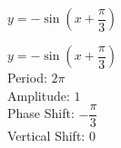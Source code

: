 {$y = -\sin \left( x + \dfrac{\pi}{3} \right)$}
{$y = -\sin \left( x + \dfrac{\pi}{3} \right)$\\
Period: $2\pi$\\
Amplitude: $1$\\
Phase Shift: $-\dfrac{\pi}{3}$\\
Vertical Shift: $0$

\begin{center}
\end{center}
}
